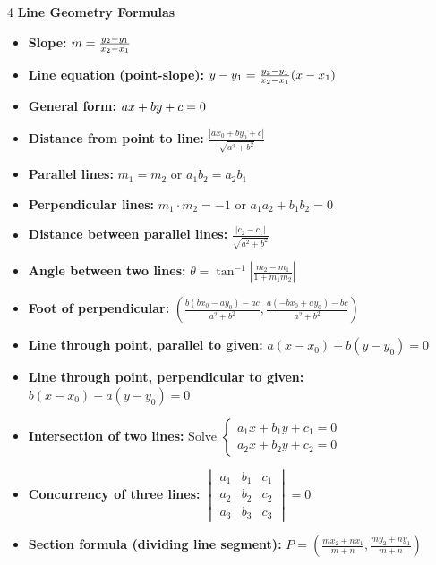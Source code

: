 \begin{multicols*}{4}
\textbf{Line Geometry Formulas}
\begin{itemize}
    \item \textbf{Slope:} $m = \slope{x_1}{y_1}{x_2}{y_2}$
    \item \textbf{Line equation (point-slope):} $\lineeq{x_1}{y_1}{x_2}{y_2}$
    \item \textbf{General form:} $\lineeqgen$
    \item \textbf{Distance from point to line:} $\frac{|ax_0 + by_0 + c|}{\sqrt{a^2 + b^2}}$
    
    \item \textbf{Parallel lines:} $m_1 = m_2$ or $a_1b_2 = a_2b_1$
    \item \textbf{Perpendicular lines:} $m_1 \cdot m_2 = -1$ or $a_1a_2 + b_1b_2 = 0$
    
    \item \textbf{Distance between parallel lines:} $\frac{|c_2 - c_1|}{\sqrt{a^2 + b^2}}$
    \item \textbf{Angle between two lines:} $\theta = \tan^{-1}\left|\frac{m_2 - m_1}{1 + m_1m_2}\right|$
    
    \item \textbf{Foot of perpendicular:} $\left(\frac{b(bx_0 - ay_0) - ac}{a^2 + b^2}, \frac{a(-bx_0 + ay_0) - bc}{a^2 + b^2}\right)$
    
    \item \textbf{Line through point, parallel to given:} $a(x - x_0) + b(y - y_0) = 0$
    \item \textbf{Line through point, perpendicular to given:} $b(x - x_0) - a(y - y_0) = 0$
    
    \item \textbf{Intersection of two lines:} Solve $\begin{cases} a_1x + b_1y + c_1 = 0 \\ a_2x + b_2y + c_2 = 0 \end{cases}$
    
    \item \textbf{Concurrency of three lines:} $\begin{vmatrix}
    a_1 & b_1 & c_1 \\
    a_2 & b_2 & c_2 \\
    a_3 & b_3 & c_3
    \end{vmatrix} = 0$
    
    \item \textbf{Section formula (dividing line segment):} 
    $P = \left(\frac{mx_2 + nx_1}{m+n}, \frac{my_2 + ny_1}{m+n}\right)$
    

\end{itemize}
\end{multicols*}
